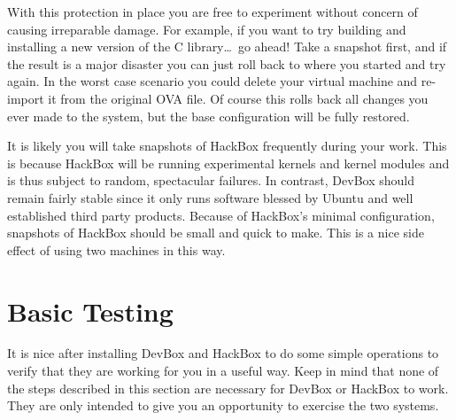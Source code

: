 \documentclass[twocolumn]{article}
\begin{document}
With this protection in place you are free to experiment without concern of causing irreparable
damage. For example, if you want to try building and installing a new version of the C
library\ldots\ go ahead! Take a snapshot first, and if the result is a major disaster you can
just roll back to where you started and try again. In the worst case scenario you could delete
your virtual machine and re-import it from the original OVA file. Of course this rolls back all
changes you ever made to the system, but the base configuration will be fully restored.

It is likely you will take snapshots of HackBox frequently during your work. This is because
HackBox will be running experimental kernels and kernel modules and is thus subject to random,
spectacular failures. In contrast, DevBox should remain fairly stable since it only runs
software blessed by Ubuntu and well established third party products. Because of HackBox's
minimal configuration, snapshots of HackBox should be small and quick to make. This is a nice
side effect of using two machines in this way.

\section{Basic Testing}

It is nice after installing DevBox and HackBox to do some simple operations to verify that they
are working for you in a useful way. Keep in mind that none of the steps described in this
section are necessary for DevBox or HackBox to work. They are only intended to give you an
opportunity to exercise the two systems.
\end{document}
